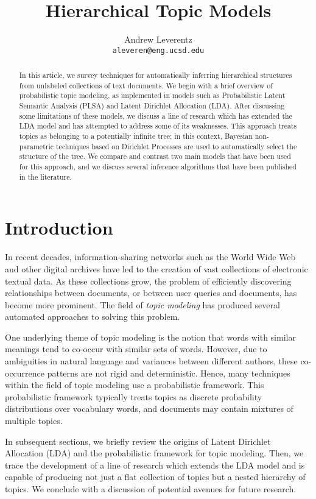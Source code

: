\documentclass{article}
\title{Hierarchical Topic Models}
\author{
  Andrew Leverentz \\
  \texttt{aleveren@eng.ucsd.edu} \\
}
\begin{document}
\maketitle

\begin{abstract}
In this article, we survey techniques for automatically inferring hierarchical structures from unlabeled collections of text documents.
We begin with a brief overview of probabilistic topic modeling, as implemented in models such as Probabilistic Latent Semantic Analysis (PLSA) and Latent Dirichlet Allocation (LDA).
After discussing some limitations of these models, we discuss a line of research which has extended the LDA model and has attempted to address some of its weaknesses.
This approach treats topics as belonging to a potentially infinite tree; in this context, Bayesian non-parametric techniques based on Dirichlet Processes are used to automatically select the structure of the tree.
We compare and contrast two main models that have been used for this approach, and we discuss several inference algorithms that have been published in the literature.
\end{abstract}

\section{Introduction}

In recent decades, information-sharing networks such as the World Wide Web and other digital archives have led to the creation of vast collections of electronic textual data.
As these collections grow, the problem of efficiently discovering relationships between documents, or between  user queries and documents, has become more prominent.
The field of \emph{topic modeling} has produced several automated approaches to solving this problem.

One underlying theme of topic modeling is the notion that words with similar meanings tend to co-occur with similar sets of words.
However, due to ambiguities in natural language and variances between different authors, these co-occurrence patterns are not rigid and deterministic.
Hence, many techniques within the field of topic modeling use a probabilistic framework.
This probabilistic framework typically treats topics as discrete probability distributions over vocabulary words, and documents may contain mixtures of multiple topics.

In subsequent sections, we briefly review the origins of Latent Dirichlet Allocation (LDA) and the probabilistic framework for topic modeling.
Then, we trace the development of a line of research which extends the LDA model and is capable of producing not just a flat collection of topics but a nested hierarchy of topics.
We conclude with a discussion of potential avenues for future research.
\end{document}
